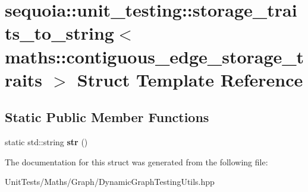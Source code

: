 \hypertarget{structsequoia_1_1unit__testing_1_1storage__traits__to__string_3_01maths_1_1contiguous__edge__storage__traits_01_4}{}\section{sequoia\+::unit\+\_\+testing\+::storage\+\_\+traits\+\_\+to\+\_\+string$<$ maths\+::contiguous\+\_\+edge\+\_\+storage\+\_\+traits $>$ Struct Template Reference}
\label{structsequoia_1_1unit__testing_1_1storage__traits__to__string_3_01maths_1_1contiguous__edge__storage__traits_01_4}
\subsection*{Static Public Member Functions}
\begin{DoxyCompactItemize}
\item 
\mbox{\label{structsequoia_1_1unit__testing_1_1storage__traits__to__string_3_01maths_1_1contiguous__edge__storage__traits_01_4_a260e0eac1af853f09eedd22cb10a3e1d}} 
static std\+::string {\bfseries str} ()
\end{DoxyCompactItemize}


The documentation for this struct was generated from the following file\+:\begin{DoxyCompactItemize}
\item 
Unit\+Tests/\+Maths/\+Graph/Dynamic\+Graph\+Testing\+Utils.\+hpp\end{DoxyCompactItemize}
